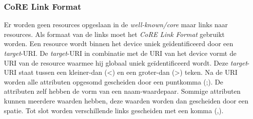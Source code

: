 \subsubsection{CoRE Link Format}
Er worden geen resources opgeslaan in de \textit{well-known/core} maar links naar resources. Als formaat van de links moet het \textit{CoRE Link Format} gebruikt worden. Een resource wordt binnen het device uniek ge\"{i}dentificeerd door een \textit{target}-URI. De \textit{target}-URI in combinatie met de URI van het device vormt de URI van de resource waarmee hij globaal uniek ge\"{i}dentificeerd wordt. Deze \textit{target}-URI staat tussen een kleiner-dan (\textless) en een groter-dan (\textgreater) teken. Na de URI worden alle attributen opgesomd gescheiden door een puntkomma (;). De attributen zelf hebben de vorm van een naam-waardepaar. Sommige attributen kunnen meerdere waarden hebben, deze waarden worden dan gescheiden door een spatie. Tot slot worden verschillende links gescheiden met een komma (,).\\

